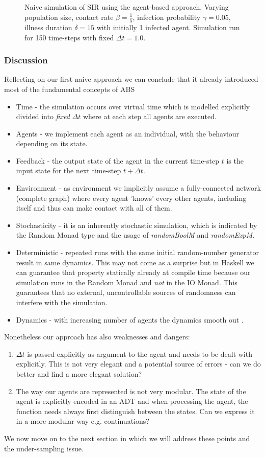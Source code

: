 \begin{figure}
\begin{center}
	\caption{Naive simulation of SIR using the agent-based approach. Varying population size, contact rate $\beta = \frac{1}{5}$, infection probability $\gamma = 0.05$, illness duration $\delta = 15$ with initially 1 infected agent. Simulation run for 150 time-steps with fixed $\Delta t = 1.0$.} 
	\label{fig:sir_abs_dynamics_naive}
\end{center}
\end{figure}

\subsubsection{Discussion}
Reflecting on our first naive approach we can conclude that it already introduced most of the fundamental concepts of ABS
\begin{itemize}
	\item Time - the simulation occurs over virtual time which is modelled explicitly divided into \textit{fixed} $\Delta t$ where at each step all agents are executed.
	\item Agents - we implement each agent as an individual, with the behaviour depending on its state.
	\item Feedback - the output state of the agent in the current time-step $t$ is the input state for the next time-step $t + \Delta t$.
	\item Environment - as environment we implicitly assume a fully-connected network (complete graph) where every agent 'knows' every other agents, including itself and thus can make contact with all of them.
	\item Stochasticity - it is an inherently stochastic simulation, which is indicated by the Random Monad type and the usage of \textit{randomBoolM} and \textit{randomExpM}.
	\item Deterministic - repeated runs with the same initial random-number generator result in same dynamics. This may not come as a surprise but in Haskell we can guarantee that property statically already at compile time because our simulation runs in the Random Monad and \textit{not} in the IO Monad. This guarantees that no external, uncontrollable sources of randomness can interfere with the simulation.
	\item Dynamics - with increasing number of agents the dynamics smooth out \cite{macal_agent-based_2010}.
\end{itemize}

Nonetheless our approach has also weaknesses and dangers:
\begin{enumerate}
	\item $\Delta t$ is passed explicitly as argument to the agent and needs to be dealt with explicitly. This is not very elegant and a potential source of errors - can we do better and find a more elegant solution? 
	\item The way our agents are represented is not very modular. The state of the agent is explicitly encoded in an ADT and when processing the agent, the function needs always first distinguish between the states. Can we express it in a more modular way e.g. continuations?
\end{enumerate}

We now move on to the next section in which we will address these points and the under-sampling issue.